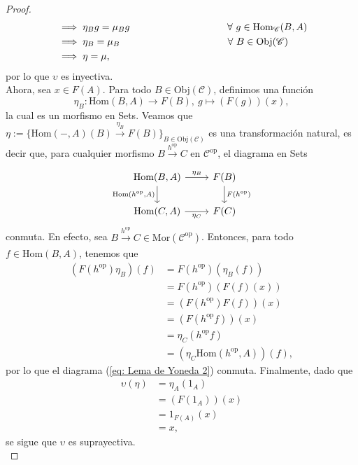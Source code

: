 \documentclass[tesis]{subfiles}
\begin{document}
\begin{proof}
\begin{align*}
                            &\implies \eta_Bg = \mu_Bg \quad \quad \quad \quad \quad \quad \quad \quad \quad \quad \hspace{-0.05mm} \forall \ g\in \text{Hom}_{\mathscr{C}}(B,A) \\
                            &\implies \eta_B = \mu_B \hspace{24.8mm} \quad \quad \quad \quad \forall \ B\in\text{Obj}(\mathscr{C}) \\
                            &\implies \eta = \mu,
    \end{align*}
    por lo que $\upsilon$ es inyectiva. \\

    Ahora, sea $x\in F(A)$. Para todo $B\in\text{Obj}(\mathscr{C})$, definimos una función
    \[
        \eta_B:\text{Hom}(B,A)\to F(B), \ g \mapsto (F(g))(x),
    \]
    la cual es un morfismo en Sets. Veamos que $\eta := \{\text{Hom}(-,A)(B)\xrightarrow[]{\eta_B} F(B)\}_{B\in\text{Obj}(\mathscr{C})}$ es una transformación natural, es decir que, para cualquier morfismo $B\xrightarrow[]{h^\text{op}}C$ en $\mathscr{C}^\text{op}$, el diagrama en Sets
    \begin{equation}\label{eq: Lema de Yoneda 2}
        \begin{tikzcd}
            \text{Hom}(B,A) \arrow[]{d}[swap]{\text{Hom}(h^\text{op},A)} \arrow[]{r}[]{\eta_B} &F(B) \arrow[]{d}[]{F(h^\text{op})} \\
            \text{Hom}(C,A) \arrow[]{r}[swap]{\eta_C} &F(C)
        \end{tikzcd}
    \end{equation}
    conmuta. En efecto, sea $B\xrightarrow[]{h^\text{op}} C\in\text{Mor}(\mathscr{C}^\text{op})$. Entonces, para todo $f\in\text{Hom}(B,A)$, tenemos que
    \begin{align*}
        (F(h^\text{op})\eta_B)(f) &= F(h^\text{op})(\eta_B(f)) \\
                        &= F(h^\text{op})(F(f)(x))  \\
                        &= (F(h^\text{op})F(f))(x) \\
                        &= (F(h^\text{op}f))(x) \tag{$F$ es un funtor} \\
                        &= \eta_C(h^\text{op}f) \\
                        &= (\eta_C\text{Hom}(h^\text{op},A))(f),
    \end{align*}
    por lo que el diagrama (\ref{eq: Lema de Yoneda 2}) conmuta. Finalmente, dado que
    \begin{align*}
        \upsilon(\eta) &= \eta_A(1_A) \\
                &= (F(1_A))(x) \\
                &= 1_{F(A)}(x) \\
                &= x,
    \end{align*}
    se sigue que $\upsilon$ es suprayectiva. \\


\end{proof}
\end{document}
